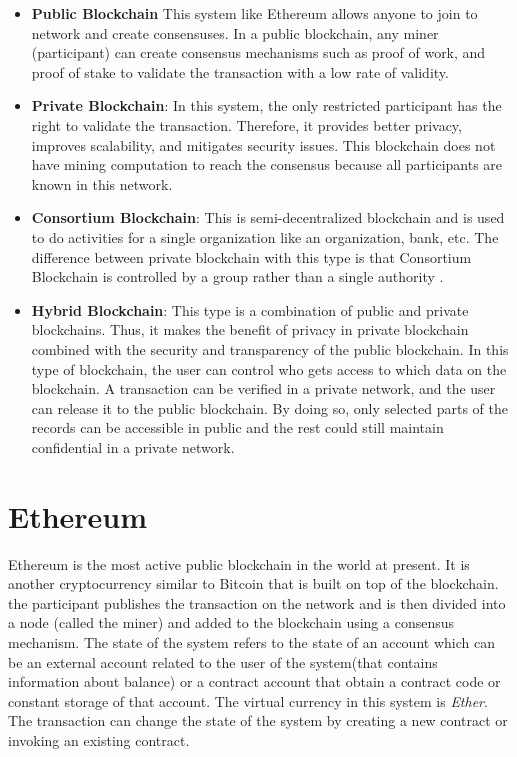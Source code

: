 \begin{itemize}
    \item \textbf{Public Blockchain}
    This system like Ethereum allows anyone to join to network and create consensuses. In a public blockchain, any miner (participant) can create consensus mechanisms such as proof of work, and proof of stake to validate the transaction with a low rate of validity\cite{Kalra}.
    \item \textbf{Private Blockchain}: In this system, the only restricted participant has the right to validate the transaction. Therefore, it provides better privacy, improves scalability, and mitigates security issues. This blockchain does not have mining computation to reach the consensus because all participants are known in this network\cite{Kalra}. 
    \item \textbf{Consortium Blockchain}: This is semi-decentralized blockchain and is used to do activities for a single organization like an organization, bank, etc. The difference between private blockchain with this type is that Consortium Blockchain is controlled by a group rather than a single authority \cite{Aithal}.
    \item \textbf{Hybrid Blockchain}: This type is a combination of public and private blockchains. Thus, it makes the benefit of privacy in private blockchain combined with the security and transparency of the public blockchain. In this type of blockchain, the user can control who gets access to which data on the blockchain. A transaction can be verified in a private network, and the user can release it to the public blockchain. By doing so, only selected parts of the records can be accessible in public and the rest could still maintain confidential in a private network\cite{Aithal}. 
\end{itemize}

 \section{Ethereum}
 Ethereum is the most active public blockchain in the world at present. It is another cryptocurrency similar to Bitcoin that is built on top of the blockchain. the participant publishes the transaction on the network and is then divided into a node (called the miner) and added to the blockchain using a consensus mechanism. The state of the system refers to the state of an account which can be an external account related to the user of the system(that contains information about balance) or a contract account that obtain a contract code or constant storage of that account. The virtual currency in this system is \textit{Ether}. The transaction can change the state of the system by creating a new contract or invoking an existing contract\cite{Ilya}.

